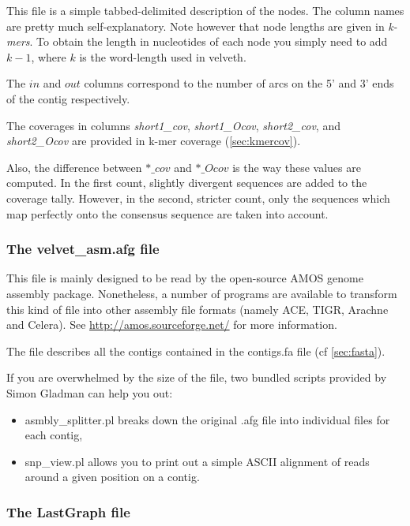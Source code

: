 \documentclass{article}
\begin{document}
\label{sec:stats}

This file is a simple tabbed-delimited description of the nodes. The column names are pretty much self-explanatory. Note however that node lengths are given in \emph{k-mers}. To obtain the length in nucleotides of each node you simply need to add $k-1$, where $k$ is the word-length used in velveth.

The $in$ and $out$ columns correspond to the number of arcs on the 5' and 3' ends of the contig respectively.

The coverages in columns \emph{short1\_cov}, \emph{short1\_Ocov}, \emph{short2\_cov}, and \emph{short2\_Ocov} are provided in k-mer coverage (\ref{sec:kmercov}).

Also, the difference between $*\_cov$ and $*\_Ocov$ is the way these values are computed. In the first count, slightly divergent sequences are added to the coverage tally. However, in the second, stricter count, only the sequences which map perfectly onto the consensus sequence are taken into account.

\subsubsection{The velvet\_asm.afg file}

\label{sec:amos}

This file is mainly designed to be read by the open-source AMOS genome assembly package. Nonetheless, a number of programs are available to transform this kind of file into other assembly file formats (namely ACE, TIGR, Arachne and Celera). See \href{http://amos.sourceforge.net/}{http://amos.sourceforge.net/} for more information.

The file describes all the contigs contained in the contigs.fa file (cf \ref{sec:fasta}). 

If you are overwhelmed by the size of the file, two bundled scripts provided by Simon Gladman can help you out:
\begin{itemize}
\item asmbly\_splitter.pl breaks down the  original .afg file into individual files for each contig,
\item snp\_view.pl allows you to print out a simple ASCII alignment of reads around a given position on a contig.
\end{itemize}

\subsubsection{The LastGraph file}
\end{document}
